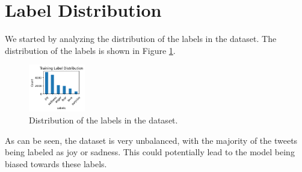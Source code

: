 \section{Label Distribution}
We started by analyzing the distribution of the labels in the dataset. The distribution of the labels is shown in Figure \ref{fig:label_dist}.
\begin{figure}[H]
    \vspace*{0.7cm}
    \centering
    \includegraphics[width=0.22\textwidth]{figures/label_dist.png}
    \caption{Distribution of the labels in the dataset.}
    \label{fig:label_dist}
    \vspace*{0.7cm}
\end{figure}
As can be seen, the dataset is very unbalanced, with the majority of the tweets being labeled as joy or sadness. This could potentially lead to the model being biased towards these labels.